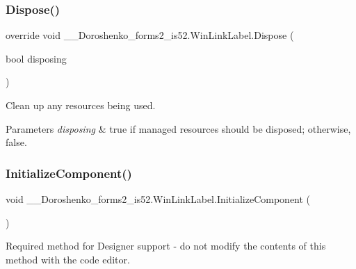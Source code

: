 \subsubsection{\texorpdfstring{Dispose()}{Dispose()}}
{\footnotesize\ttfamily override void \+\_\+\_\+\+Doroshenko\+\_\+forms2\+\_\+is52.\+Win\+Link\+Label.\+Dispose (\begin{DoxyParamCaption}\item[{bool}]{disposing }\end{DoxyParamCaption})\hspace{0.3cm}{\ttfamily [protected]}}



Clean up any resources being used. 


\begin{DoxyParams}{Parameters}
{\em disposing} & true if managed resources should be disposed; otherwise, false.\\
\hline
\end{DoxyParams}
\hypertarget{class__7___doroshenko__forms2__is52_1_1_win_link_label_a7a9e712d1d3faa8d7ae3f7072d526379}{}\label{class__7___doroshenko__forms2__is52_1_1_win_link_label_a7a9e712d1d3faa8d7ae3f7072d526379} 
\subsubsection{\texorpdfstring{Initialize\+Component()}{InitializeComponent()}}
{\footnotesize\ttfamily void \+\_\+\_\+\+Doroshenko\+\_\+forms2\+\_\+is52.\+Win\+Link\+Label.\+Initialize\+Component (\begin{DoxyParamCaption}{ }\end{DoxyParamCaption})\hspace{0.3cm}{\ttfamily [private]}}



Required method for Designer support -\/ do not modify the contents of this method with the code editor. 

